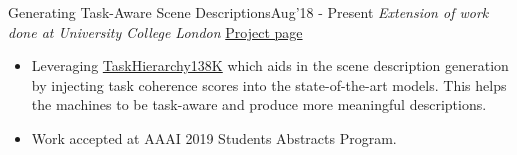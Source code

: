 \begin{projects}
	\project
	{Generating Task-Aware Scene Descriptions}{Aug'18 - Present}
	{\textit{Extension of work done at University College London} \href{https://usercontext.github.io/SceneTask/}{Project page}}
	{\begin{itemize}
     \item Leveraging \href{https://usercontext.github.io/TaskHierarchy138K/}{TaskHierarchy138K} which aids in the scene description generation by injecting task coherence scores into the state-of-the-art models. This helps the machines to be task-aware and produce more meaningful descriptions.
     \item Work accepted at AAAI 2019 Students Abstracts Program.
     \end{itemize}}

\end{projects}
